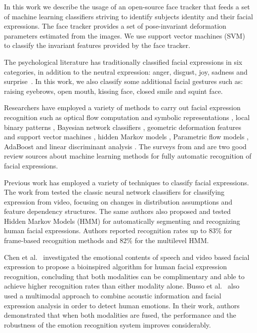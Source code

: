 \documentclass[]{article}
\begin{document}
In this work we describe the usage of an open-source face tracker that feeds a set of machine learning classifiers
striving to identify subjects identity and their facial expressions. The face tracker provides a set of pose-invariant
deformation parameters estimated from the images. We use support vector machines (SVM) to classify the invariant
features provided by the face tracker.


The psychological literature has traditionally classified facial expressions in six categories, in addition to the
neutral expression: anger, disgust, joy, sadness and surprise~\cite{schmidt2002human}. In this work, we
also classify some additional facial gestures such as: raising eyebrows, open mouth, kissing face, closed smile and
squint face.


Researchers have employed a variety of methods to carry out facial expression recognition such as optical flow
computation  and symbolic representations \cite{Yacoob506414}, local binary patterns \cite{Shan2009803},  Bayesian
network classifiers \cite{Cohen1211408}, geometric deformation features and support vector machines
\cite{kotsia4032815}, hidden Markov models \cite{aleksic1597130, Cohen2003160}, Parametric flow models
\cite{blackAndYacoob}, AdaBoost and linear discriminant analysis \cite{bartlett1398364}. The surveys from
\cite{bartlett1398364} and \cite{Fasel2003259} are two good review sources about machine learning methods 
for fully automatic recognition of facial expressions. 


Previous work has employed a variety of techniques to classify  facial expressions. The work from \cite{Cohen2003160}
tested the classic neural network classifiers for classifying expression from video, focusing on changes in distribution
assumptions and feature dependency structures. The same authors also proposed and tested Hidden Markov Models (HMM) for
automatically segmenting and recognizing human facial expressions. Authors reported recognition rates up to 83\% for
frame-based recognition methods and 82\% for the multilevel HMM.


Chen et al.~\cite{Chen670976} investigated the emotional contents of speech and video based facial expression to
propose a bioinspired algorithm for human facial expression recognition, concluding that both modalities can be
complimentary and able to achieve higher recognition rates than either modality alone. Busso et al.~\cite{Busso:2004} also
used a multimodal approach to combine acoustic information and facial expression analysis in order to detect human
emotions. In their work, authors demonstrated that when both modalities are fused, the performance and the robustness of
the emotion recognition system improves considerably.
\end{document}
